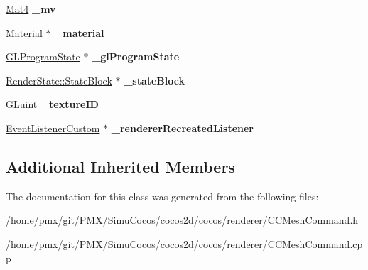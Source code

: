 \begin{DoxyCompactItemize}
\hyperlink{classMat4}{Mat4} {\bfseries \+\_\+mv}
\item 
\mbox{\label{classMeshCommand_acd469f439fb82a0c4b353f15569c0556}} 
\hyperlink{classMaterial}{Material} $\ast$ {\bfseries \+\_\+material}
\item 
\mbox{\label{classMeshCommand_afa8c9982360675acf16fcd12ea0454d1}} 
\hyperlink{classGLProgramState}{G\+L\+Program\+State} $\ast$ {\bfseries \+\_\+gl\+Program\+State}
\item 
\mbox{\label{classMeshCommand_acbe84c29e0b14f2f673c7b5183d4a9e6}} 
\hyperlink{classRenderState_1_1StateBlock}{Render\+State\+::\+State\+Block} $\ast$ {\bfseries \+\_\+state\+Block}
\item 
\mbox{\label{classMeshCommand_a9d0f2fe4b6680c60b988fed05f0d1c59}} 
G\+Luint {\bfseries \+\_\+texture\+ID}
\item 
\mbox{\label{classMeshCommand_a644bfeebd325901b00d231e11769822d}} 
\hyperlink{classEventListenerCustom}{Event\+Listener\+Custom} $\ast$ {\bfseries \+\_\+renderer\+Recreated\+Listener}
\end{DoxyCompactItemize}
\subsection*{Additional Inherited Members}


The documentation for this class was generated from the following files\+:\begin{DoxyCompactItemize}
\item 
/home/pmx/git/\+P\+M\+X/\+Simu\+Cocos/cocos2d/cocos/renderer/C\+C\+Mesh\+Command.\+h\item 
/home/pmx/git/\+P\+M\+X/\+Simu\+Cocos/cocos2d/cocos/renderer/C\+C\+Mesh\+Command.\+cpp\end{DoxyCompactItemize}
